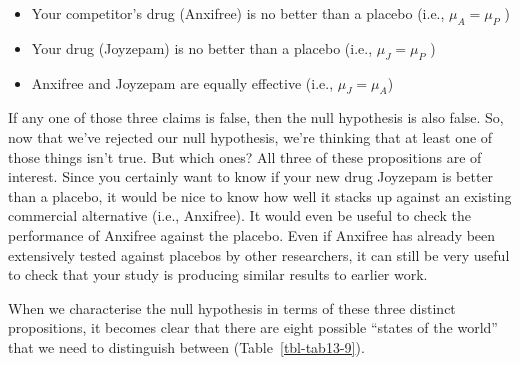 \documentclass[
  a4paper,
]{book}
\providecommand{\tightlist}{%
  \setlength{\itemsep}{0pt}\setlength{\parskip}{0pt}}\usepackage{longtable,booktabs,array}
\begin{document}
\begin{itemize}
\tightlist
\item
  Your competitor's drug (Anxifree) is no better than a placebo (i.e.,
  \(\mu_A = \mu_P\) )
\item
  Your drug (Joyzepam) is no better than a placebo (i.e.,
  \(\mu_J = \mu_P\) )
\item
  Anxifree and Joyzepam are equally effective (i.e., \(\mu_J = \mu_A\))
\end{itemize}

If any one of those three claims is false, then the null hypothesis is
also false. So, now that we've rejected our null hypothesis, we're
thinking that at least one of those things isn't true. But which ones?
All three of these propositions are of interest. Since you certainly
want to know if your new drug Joyzepam is better than a placebo, it
would be nice to know how well it stacks up against an existing
commercial alternative (i.e., Anxifree). It would even be useful to
check the performance of Anxifree against the placebo. Even if Anxifree
has already been extensively tested against placebos by other
researchers, it can still be very useful to check that your study is
producing similar results to earlier work.

When we characterise the null hypothesis in terms of these three
distinct propositions, it becomes clear that there are eight possible
``states of the world'' that we need to distinguish between
(Table~\ref{tbl-tab13-9}).

\hypertarget{tbl-tab13-9}{}
 
  \providecommand{\huxb}[2]{\arrayrulecolor[RGB]{#1}\global\arrayrulewidth=#2pt}
  \providecommand{\huxvb}[2]{\color[RGB]{#1}\vrule width #2pt}
  \providecommand{\huxtpad}[1]{\rule{0pt}{#1}}
  \providecommand{\huxbpad}[1]{\rule[-#1]{0pt}{#1}}
\end{document}
